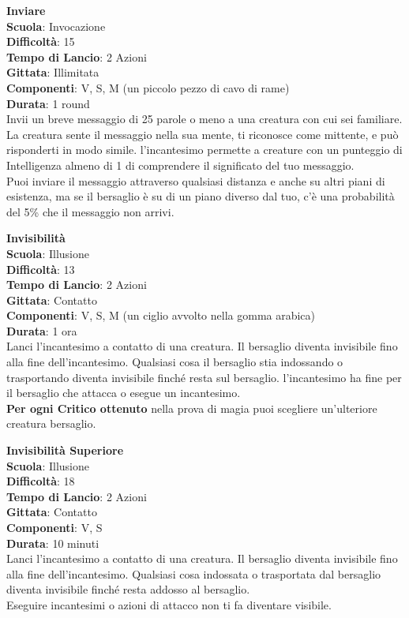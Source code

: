 \begin{multicols}{2}
\medskip\textbf{Inviare}\\
\textbf{Scuola}: Invocazione\\
\textbf{Difficoltà}:  15\\
\textbf{Tempo di Lancio}: 2 Azioni\\
\textbf{Gittata}: Illimitata\\
\textbf{Componenti}: V, S, M (un piccolo pezzo di cavo di rame)\\
\textbf{Durata}: 1 round\\
Invii un breve messaggio di 25 parole o meno a una creatura con cui sei familiare. La creatura sente il messaggio nella sua mente, ti riconosce come mittente, e può risponderti in modo simile. l'incantesimo permette a creature con un punteggio di Intelligenza almeno di 1 di comprendere il significato del tuo messaggio.\\
Puoi inviare il messaggio attraverso qualsiasi distanza e anche su altri piani di esistenza, ma se il bersaglio è su di un piano diverso dal tuo, c’è una probabilità del 5\% che il messaggio non arrivi.

\medskip\textbf{Invisibilità}\\
\textbf{Scuola}: Illusione\\
\textbf{Difficoltà}:  13\\
\textbf{Tempo di Lancio}: 2 Azioni\\
\textbf{Gittata}: Contatto\\
\textbf{Componenti}: V, S, M (un ciglio avvolto nella gomma arabica)\\
\textbf{Durata}: 1 ora \\
Lanci l'incantesimo a contatto di una creatura. Il bersaglio diventa invisibile fino alla fine dell'incantesimo. Qualsiasi cosa il bersaglio stia indossando o trasportando diventa invisibile finché resta sul bersaglio. l'incantesimo ha fine per il bersaglio che attacca o esegue un incantesimo.\\
\textbf{Per ogni Critico ottenuto} nella prova di magia puoi scegliere un'ulteriore creatura bersaglio.

\medskip\textbf{Invisibilità Superiore}\\
\textbf{Scuola}: Illusione\\
\textbf{Difficoltà}:  18\\
\textbf{Tempo di Lancio}: 2 Azioni\\
\textbf{Gittata}: Contatto\\
\textbf{Componenti}: V, S\\
\textbf{Durata}: 10 minuti\\
Lanci l'incantesimo a contatto di una creatura. Il bersaglio diventa invisibile fino alla fine dell'incantesimo. Qualsiasi cosa indossata o trasportata dal bersaglio diventa invisibile finché resta addosso al bersaglio.\\
Eseguire incantesimi o azioni di attacco non ti fa diventare visibile.



\end{multicols}
